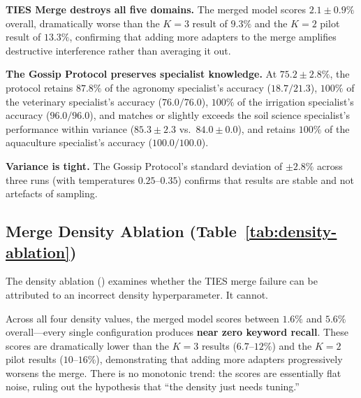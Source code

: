 \documentclass[conference, 10pt]{IEEEtran}
\begin{document}
\textbf{TIES Merge destroys all five domains.}
The merged model scores $2.1 \pm 0.9\%$ overall, dramatically worse than
the $K=3$ result of $9.3\%$ and the $K=2$ pilot result of $13.3\%$,
confirming that adding more adapters to the merge amplifies destructive
interference rather than averaging it out.

\textbf{The Gossip Protocol preserves specialist knowledge.}
At $75.2 \pm 2.8\%$, the protocol retains $87.8\%$ of the agronomy
specialist's accuracy ($18.7 / 21.3$), $100\%$ of the veterinary
specialist's accuracy ($76.0 / 76.0$), $100\%$ of the irrigation
specialist's accuracy ($96.0 / 96.0$), and matches or slightly exceeds
the soil science specialist's performance within variance
($85.3 \pm 2.3$ vs.\ $84.0 \pm 0.0$), and retains $100\%$ of the
aquaculture specialist's accuracy ($100.0 / 100.0$).

\textbf{Variance is tight.}
The Gossip Protocol's standard deviation of $\pm 2.8\%$ across three
runs (with temperatures $0.25$--$0.35$) confirms that results are
stable and not artefacts of sampling.

\subsection{Merge Density Ablation (Table~\ref{tab:density-ablation})}

\begin{table}[htbp]
\centering
\caption{TIES merge density ablation ($K=5$, $\%$). No density value rescues the
merged model.}
\label{tab:density-ablation}
\end{table}

The density ablation () examines whether the
TIES merge failure can be attributed to an incorrect density
hyperparameter. It cannot.

Across all four density values, the merged model scores between
$1.6\%$ and $5.6\%$ overall---every single configuration produces
\textbf{near zero keyword recall}.
These scores are dramatically lower than the $K=3$ results ($6.7$--$12\%$)
and the $K=2$ pilot results ($10$--$16\%$),
demonstrating that adding more adapters progressively worsens the merge.
There is no monotonic trend: the scores are essentially flat noise,
ruling out the hypothesis that ``the density just needs tuning.''
\end{document}
